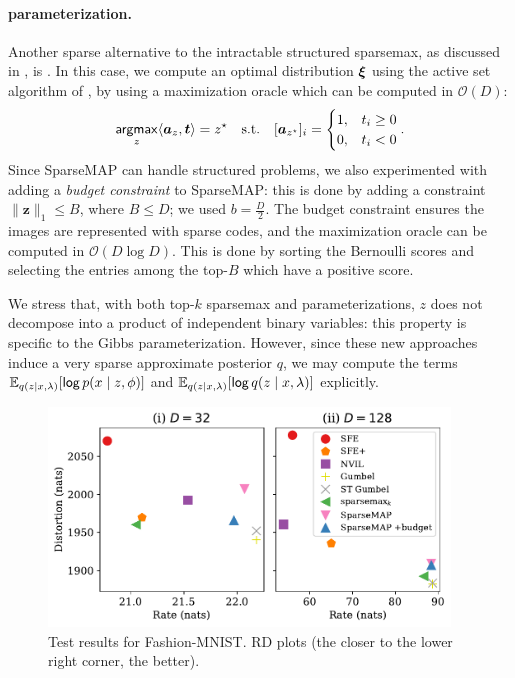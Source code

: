 \paragraph*{\smap parameterization.} Another sparse alternative to the
intractable structured sparsemax, as discussed in
, is \smap. In this case, we compute an optimal
distribution $\bm{\xi}$ using the active set algorithm of
\citet{niculae2018sparsemap}, by using a maximization oracle which
can be computed in $\mathcal{O}(D)$:
\begin{equation}
    \operatorname*{\mathsf{argmax}}_z \langle\bm{a}_z,\bm{t}\rangle = z^\star \quad \text{s.t.}\quad
    [\bm{a}_{z^\star}]_i = \begin{cases}
        1, & t_i \geq 0 \\
        0, & t_i < 0    \\
    \end{cases}.
\end{equation}
Since SparseMAP can handle structured problems, we also experimented
with adding a \emph{budget constraint} to SparseMAP: this is done by
adding a constraint $\|\bm{z}\|_1 \le B$, where $B \le D$; we used
$b=\frac{D}{2}$. The budget constraint ensures the images are
represented with sparse codes, and the maximization oracle can be
computed in $\mathcal{O}(D \log D)$. This
is done by sorting the Bernoulli scores and selecting the entries
among the top-$B$ which have a positive score.

We stress that, with both top-$k$ sparsemax and \smap parameterizations,
$z$ does not decompose into a product of independent
binary variables: this property is specific to the Gibbs parameterization.
However, since these new approaches induce a very sparse approximate posterior
$q$, we may compute the terms $\mathbb{E}_{q(z\mid x, \lambda)} [\operatorname*{\mathsf{log}} p(x \mid z,
        \phi)]$ and $\mathbb{E}_{q(z\mid x, \lambda)} [\operatorname*{\mathsf{log}} q(z \mid x, \lambda)]$
explicitly.

\begin{figure}[htbp]
    \centering
    \includegraphics[width=0.95\textwidth]{Figures/distortion-rate.pdf}
    \caption{\label{fig:distortion_rd}Test results for Fashion-MNIST. RD plots
        (the closer to the lower right corner, the better).}
\end{figure}

